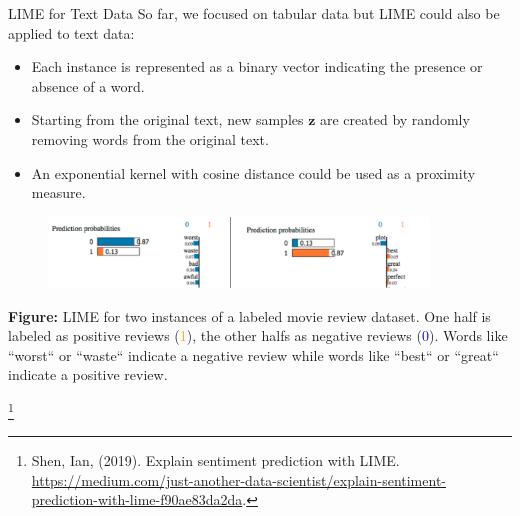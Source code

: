 \documentclass[11pt,compress,t,notes=noshow, xcolor=table]{beamer}
\newcommand{\zv}{\mathbf{z}}
\begin{document}
%
%
%

\begin{vbframe}{LIME for Text Data}
	So far, we focused on tabular data but LIME could also be applied to text data: 
	\begin{itemize}
		\item Each instance is represented as a binary vector indicating the presence or absence of a word.
		\item Starting from the original text, new samples $\zv$ are created by randomly removing words from the original text.
		\item An exponential kernel with cosine distance could be used as a proximity measure. 
	\end{itemize}
	
	\begin{figure}
		\begin{center}
			\includegraphics[width=0.9\textwidth]{figure/lime_movier}
		\end{center}
	\end{figure}
	
	
	\scriptsize{\textbf{Figure:} LIME for two instances of a labeled movie review dataset. One half is labeled as positive reviews (\textcolor{orange}{1}), 
		the other halfs as negative reviews (\textcolor{blue}{0}). Words like ``worst`` or ``waste`` indicate a negative review while words like ``best`` or ``great`` indicate a positive review.}
	
	\footnote[frame]{Shen, Ian, (2019). Explain sentiment prediction with LIME.
		\url{https://medium.com/just-another-data-scientist/explain-sentiment-prediction-with-lime-f90ae83da2da}.}
	
	\end{vbframe}
	
\end{document}
